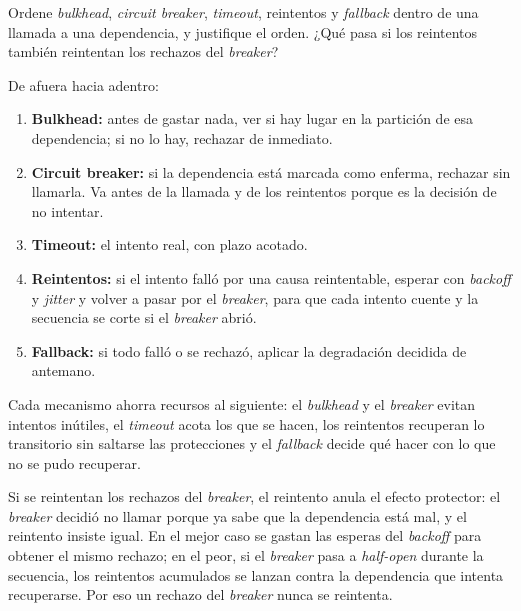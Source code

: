 \documentclass[variant=guia,cover=institutional,mode=screen]{ua-engineering-v6-article}
\begin{document}
\begin{uaexercise}
Ordene \emph{bulkhead}, \emph{circuit breaker}, \emph{timeout}, reintentos y \emph{fallback} dentro de una llamada a una dependencia, y justifique el orden. ¿Qué pasa si los reintentos también reintentan los rechazos del \emph{breaker}?
\end{uaexercise}
\begin{uaanswer}
De afuera hacia adentro:
\begin{enumerate}
\item \textbf{Bulkhead:} antes de gastar nada, ver si hay lugar en la partición de esa dependencia; si no lo hay, rechazar de inmediato.
\item \textbf{Circuit breaker:} si la dependencia está marcada como enferma, rechazar sin llamarla. Va antes de la llamada y de los reintentos porque es la decisión de no intentar.
\item \textbf{Timeout:} el intento real, con plazo acotado.
\item \textbf{Reintentos:} si el intento falló por una causa reintentable, esperar con \emph{backoff} y \emph{jitter} y volver a pasar por el \emph{breaker}, para que cada intento cuente y la secuencia se corte si el \emph{breaker} abrió.
\item \textbf{Fallback:} si todo falló o se rechazó, aplicar la degradación decidida de antemano.
\end{enumerate}
Cada mecanismo ahorra recursos al siguiente: el \emph{bulkhead} y el \emph{breaker} evitan intentos inútiles, el \emph{timeout} acota los que se hacen, los reintentos recuperan lo transitorio sin saltarse las protecciones y el \emph{fallback} decide qué hacer con lo que no se pudo recuperar.

Si se reintentan los rechazos del \emph{breaker}, el reintento anula el efecto protector: el \emph{breaker} decidió no llamar porque ya sabe que la dependencia está mal, y el reintento insiste igual. En el mejor caso se gastan las esperas del \emph{backoff} para obtener el mismo rechazo; en el peor, si el \emph{breaker} pasa a \emph{half-open} durante la secuencia, los reintentos acumulados se lanzan contra la dependencia que intenta recuperarse. Por eso un rechazo del \emph{breaker} nunca se reintenta.
\end{uaanswer}
\end{document}
